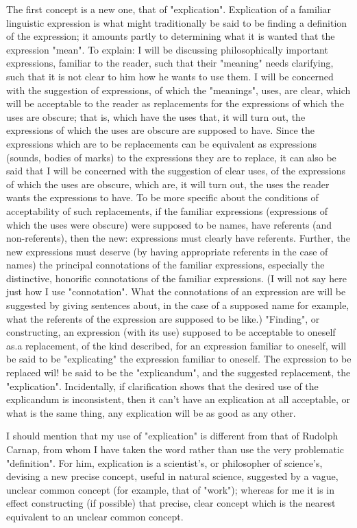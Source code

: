 \documentclass[10pt,twoside]{memoir}
\begin{document}
\begin{enumerate}
The first concept is a new one, that of "explication". Explication of a 
familiar linguistic expression is what might traditionally be said to be finding 
a definition of the expression; it amounts partly to determining what it is 
wanted that the expression "mean". To explain: I will be discussing 
philosophically important expressions, familiar to the reader, such that their 
"meaning" needs clarifying, such that it is not clear to him how he wants to 
use them. I will be concerned with the suggestion of expressions, of which 
the "meanings", uses, are clear, which will be acceptable to the reader as 
replacements for the expressions of which the uses are obscure; that is, 
which have the uses that, it will turn out, the expressions of which the uses 
are obscure are supposed to have. Since the expressions which are to be 
replacements can be equivalent as expressions (sounds, bodies of marks) to 
the expressions they are to replace, it can also be said that I will be 
concerned with the suggestion of clear uses, of the expressions of which the 
uses are obscure, which are, it will turn out, the uses the reader wants the 
expressions to have. To be more specific about the conditions of 
acceptability of such replacements, if the familiar expressions (expressions of 
which the uses were obscure) were supposed to be names, have referents 
(and non-referents), then the new: expressions must clearly have referents. 
Further, the new expressions must deserve (by having appropriate referents 
in the case of names) the principal connotations of the familiar expressions, 
especially the distinctive, honorific connotations of the familiar expressions. 
(I will not say here just how I use "connotation". What the connotations of 
an expression are will be suggested by giving sentences about, in the case of a 
supposed name for example, what the referents of the expression are 
supposed to be like.) "Finding", or constructing, an expression (with its use) 
supposed to be acceptable to oneself as.a replacement, of the kind described, 
for an expression familiar to oneself, will be said to be "explicating" the 
expression familiar to oneself. The expression to be replaced wil! be said to 
be the "explicandum", and the suggested replacement, the "explication". 
Incidentally, if clarification shows that the desired use of the explicandum is 
inconsistent, then it can't have an explication at all acceptable, or what is the 
same thing, any explication will be as good as any other. 

I should mention that my use of "explication" is different from that of 
Rudolph Carnap, from whom I have taken the word rather than use the very 
problematic "definition". For him, explication is a scientist's, or philosopher 
of science's, devising a new precise concept, useful in natural science, 
suggested by a vague, unclear common concept (for example, that of 
"work"); whereas for me it is in effect constructing (if possible) that precise, 
clear concept which is the nearest equivalent to an unclear common concept. 


\end{enumerate}
\end{document}
